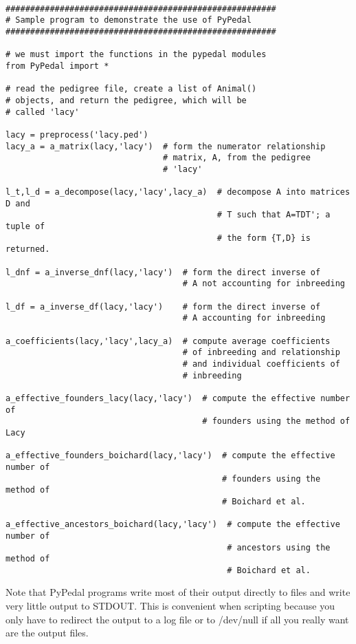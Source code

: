 \begin{verbatim}

#######################################################
# Sample program to demonstrate the use of PyPedal
#######################################################

# we must import the functions in the pypedal modules
from PyPedal import *

# read the pedigree file, create a list of Animal()
# objects, and return the pedigree, which will be
# called 'lacy'

lacy = preprocess('lacy.ped')
lacy_a = a_matrix(lacy,'lacy')  # form the numerator relationship
                                # matrix, A, from the pedigree
                                # 'lacy'

l_t,l_d = a_decompose(lacy,'lacy',lacy_a)  # decompose A into matrices D and
                                           # T such that A=TDT'; a tuple of
                                           # the form {T,D} is returned.

l_dnf = a_inverse_dnf(lacy,'lacy')  # form the direct inverse of
                                    # A not accounting for inbreeding

l_df = a_inverse_df(lacy,'lacy')    # form the direct inverse of
                                    # A accounting for inbreeding

a_coefficients(lacy,'lacy',lacy_a)  # compute average coefficients
                                    # of inbreeding and relationship
                                    # and individual coefficients of
                                    # inbreeding

a_effective_founders_lacy(lacy,'lacy')  # compute the effective number of
                                        # founders using the method of Lacy

a_effective_founders_boichard(lacy,'lacy')  # compute the effective number of
                                            # founders using the method of
                                            # Boichard et al.

a_effective_ancestors_boichard(lacy,'lacy')  # compute the effective number of
                                             # ancestors using the method of
                                             # Boichard et al.
\end{verbatim}

Note that PyPedal programs write most of their output directly to files and write very little output to STDOUT.  This is convenient when scripting because you only have to redirect the output to a log file or to /dev/null if all you really want are the output files.



